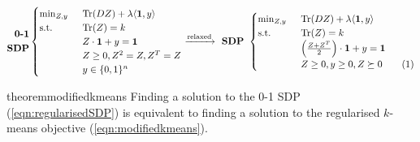 \begin{equation*}
	\begin{split}
	\textbf{0-1}\\
	\textbf{SDP}
  \end{split}
	\begin{cases}
		\min_{Z, y} \enspace &\tr(DZ) + \lambda \langle \mb 1, y\rangle\\
		\text{s.t. } \enspace &\tr(Z) = k\\
		& Z\cdot \mb 1 + y = \mb 1\\	
		&Z\ge 0, Z^2 = Z, Z^T = Z \\
		& y \in \{0, 1\}^n
	\end{cases}
	\xrightarrow{\text{relaxed}} \textbf{ SDP } 
	\begin{cases}
		\min_{Z, y} \enspace &\tr(DZ) + \lambda \langle \mb 1, y\rangle\\
        \text{s.t. } \enspace &\tr(Z) = k\\
		& \Big(\frac{Z+Z^T}{2}\Big)\cdot \mb 1 + y = \mb 1\\		
		&Z \ge 0, y \ge 0, Z \succeq 0 \numberthis\label{a-eqn:regularisedSDP}
	\end{cases}
\end{equation*}

\begin{restatable}{theorem}{modifiedkmeans}
\label{a-thm:modifiedkmeans}
Finding a solution to the 0-1 SDP (\ref{eqn:regularisedSDP}) is equivalent to finding a solution to the regularised $k$-means objective (\ref{eqn:modifiedkmeans}). 
\end{restatable}

